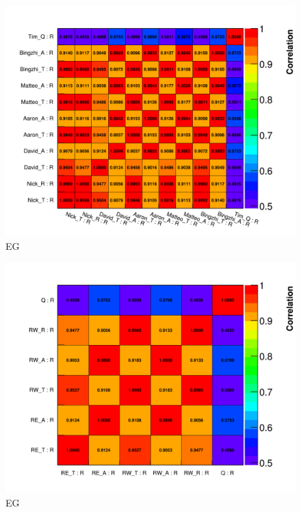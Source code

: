 \begin{figure}[]
\centering
\includegraphics[width=\textwidth]{MethodType_CorrelationMatrixPlot_R_R_EG}
\caption{EG}
\label{fig:}
\end{figure}

\begin{figure}[]
\centering
\includegraphics[width=\textwidth]{MethodType_Average_CorrelationMatrixPlot_R_R_EG}
\caption{EG}
\label{fig:}
\end{figure}



